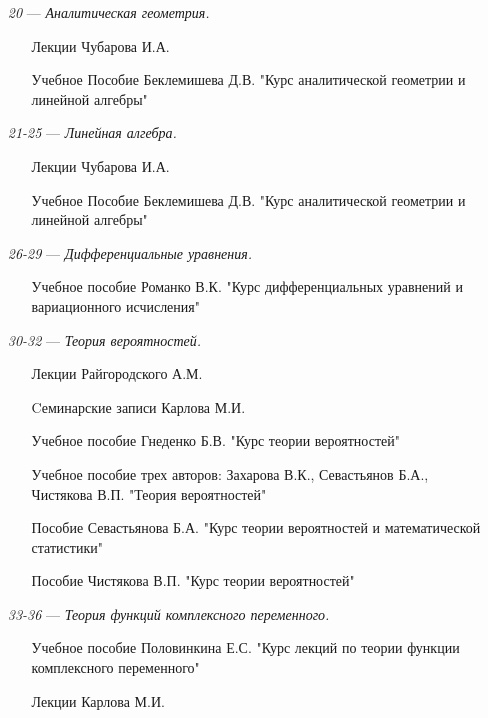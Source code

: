 \begin{itemize}
\item[\textit{20}] 
\; --- \: \textit{Аналитическая геометрия.}
\begin{itemize}
\item[\textbullet]
Лекции Чубарова И.А. 
\item[\textbullet]
Учебное Пособие Беклемишева Д.В. "Курс аналитической геометрии и линейной алгебры"
\end{itemize}
\item[\textit{21-25}] 
\; --- \: \textit{Линейная алгебра.}
\begin{itemize}
\item[\textbullet]
Лекции Чубарова И.А. 
\item[\textbullet]
Учебное Пособие Беклемишева Д.В. "Курс аналитической геометрии и линейной алгебры"
\end{itemize}
\item[\textit{26-29}] 
\; --- \: \textit{Дифференциальные уравнения.}
\begin{itemize}
\item[\textbullet] 
Учебное пособие Романко В.К. "Курс дифференциальных уравнений и вариационного исчисления"
\end{itemize}
\item[\textit{30-32}]
\; --- \: \textit{Теория вероятностей.}
\begin{itemize}
\item[\textbullet]
Лекции Райгородского А.М.
\item[\textbullet]
Cеминарские записи Карлова М.И.
\item[\textbullet]
Учебное пособие Гнеденко Б.В. "Курс теории вероятностей"
\item [\textbullet]
Учебное пособие трех авторов: Захарова В.К., Севастьянов Б.А., Чистякова В.П. "Теория вероятностей"
\item[\textbullet]
Пособие Севастьянова Б.А. "Курс теории вероятностей и математической статистики"
\item[\textbullet]
Пособие Чистякова В.П. "Курс теории вероятностей"
\end{itemize}

\item[\textit{33-36}]
\; --- \: \textit{Теория функций комплексного переменного.}
\begin{itemize}
\item[\textbullet]
Учебное пособие Половинкина Е.С. "Курс лекций по теории функции комплексного переменного"
\item[\textbullet] 
Лекции Карлова М.И. 
\end{itemize}
\end{itemize}
